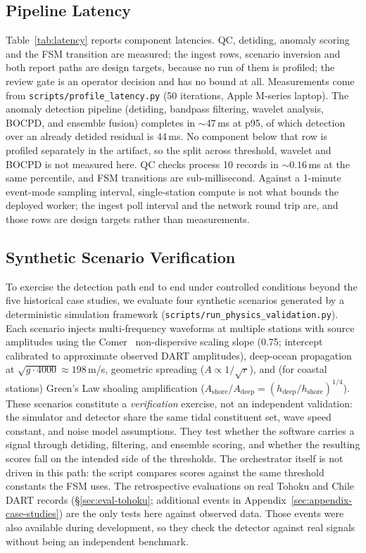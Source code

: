 \documentclass{article}
\begin{document}
\FloatBarrier
\subsection{Pipeline Latency}
\label{sec:eval-latency}

Table~\ref{tab:latency} reports component latencies.  QC, detiding,
anomaly scoring and the FSM transition are measured; the ingest rows,
scenario inversion and both report paths are design targets, because
no run of them is profiled; the review gate is an operator decision
and has no bound at all.  Measurements come from
\texttt{scripts/profile\_latency.py} (50 iterations, Apple M-series
laptop). The anomaly detection pipeline (detiding, bandpass filtering,
wavelet analysis, BOCPD, and ensemble fusion) completes in
$\sim$47\,ms at p95, of which detection over an already detided
residual is 44\,ms.  No component below that row is profiled
separately in the artifact, so the split across threshold, wavelet and
BOCPD is not measured here. QC checks process 10 records
in ${\sim}0.16$\,ms at the same percentile, and FSM transitions are
sub-millisecond. Against a 1-minute event-mode sampling interval, single-station
compute is not what bounds the deployed worker; the ingest poll
interval and the network round trip are, and those rows are design
targets rather than measurements.

\FloatBarrier
\subsection{Synthetic Scenario Verification}
\label{sec:eval-physics-sim}

To exercise the detection path end to end under controlled conditions
beyond the five historical case studies, we evaluate four synthetic
scenarios generated by a deterministic simulation framework
(\texttt{scripts/run\_physics\_validation.py}).  Each scenario injects
multi-frequency waveforms at multiple stations with source amplitudes
using the Comer~\citep{comer1980tsunami} non-dispersive scaling slope
(0.75; intercept calibrated to approximate observed DART amplitudes),
deep-ocean propagation at
$\sqrt{g \cdot 4000}\approx 198$\,m/s, geometric spreading
($A \propto 1/\sqrt{r}$), and (for coastal stations) Green's Law
shoaling amplification ($A_\text{shore}/A_\text{deep} =
(h_\text{deep}/h_\text{shore})^{1/4}$).
These scenarios constitute a \emph{verification} exercise, not an
independent validation: the simulator and detector share the same tidal
constituent set, wave speed constant, and noise model assumptions.
They test whether the software carries a signal through detiding,
filtering, and ensemble scoring, and whether the resulting scores fall
on the intended side of the thresholds.  The orchestrator itself is
not driven in this path: the script compares scores against the same
threshold constants the FSM uses.  The retrospective evaluations on real Tohoku and Chile
DART records (\S\ref{sec:eval-tohoku}; additional events in Appendix~\ref{sec:appendix-case-studies})
are the only tests here against observed data.  Those events were also
available during development, so they check the detector against real
signals without being an independent benchmark.
\end{document}

